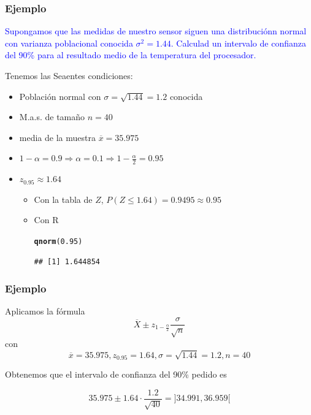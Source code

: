 \documentclass[12pt,t]{beamer}\usepackage[]{graphicx}\usepackage[]{color}
\makeatletter
\newcommand{\hlnum}[1]{\textcolor[rgb]{0.686,0.059,0.569}{#1}}%
\newcommand{\hlstd}[1]{\textcolor[rgb]{0.345,0.345,0.345}{#1}}%
\newcommand{\hlkwd}[1]{\textcolor[rgb]{0.737,0.353,0.396}{\textbf{#1}}}%
\newenvironment{kframe}{%
 \def\at@end@of@kframe{}%
 \ifinner\ifhmode%
  \def\at@end@of@kframe{\end{minipage}}%
  \begin{minipage}{\columnwidth}%
 \fi\fi%
 \def\FrameCommand##1{\hskip\@totalleftmargin \hskip-\fboxsep
 \colorbox{shadecolor}{##1}\hskip-\fboxsep
     \hskip-\linewidth \hskip-\@totalleftmargin \hskip\columnwidth}%
 \MakeFramed {\advance\hsize-\width
   \@totalleftmargin\z@ \linewidth\hsize
   \@setminipage}}%
 {\par\unskip\endMakeFramed%
 \at@end@of@kframe}
\newenvironment{knitrout}{}{} %
\newcommand{\blue}[1]{\textcolor{blue}{#1}}
\renewcommand{\leq}{\leqslant}
\theoremstyle{plain}
\theoremstyle{definition}
\makeatother
\begin{document}
\begin{frame}[fragile]
\frametitle{Ejemplo}
\vspace*{-3ex}

\blue{Supongamos  que las medidas de nuestro sensor siguen  una distribuciónn normal con varianza poblacional conocida $\sigma^2=1.44$. Calculad un intervalo de confianza  del 90\% para al resultado medio de la temperatura del procesador.}
\medskip

Tenemos las Seaentes condiciones:
\begin{itemize}
\item Población normal con $\sigma=\sqrt{1.44}=1.2$ conocida
\item M.a.s. de  tamaño  $n=40$
\item media de la muestra  $\overline{x}=35.975$
\item $1-\alpha=0.9\Rightarrow \alpha=0.1\Rightarrow 1-\frac{\alpha}{2}=0.95$
\item $z_{0.95}\approx 1.64$
\begin{itemize}
\item Con la tabla de $Z$, $P(Z\leq 1.64)=0.9495\approx 0.95$
\item Con R
\begin{knitrout}
\color{fgcolor}\begin{kframe}
\begin{alltt}
\hlkwd{qnorm}\hlstd{(}\hlnum{0.95}\hlstd{)}
\end{alltt}
\begin{verbatim}
## [1] 1.644854
\end{verbatim}
\end{kframe}
\end{knitrout}
\end{itemize}
\end{itemize}

\end{frame}


\begin{frame}
\frametitle{Ejemplo}
Aplicamos la fórmula
$$
\overline{X}\pm z_{1-\frac{\alpha}{2}} \frac{\sigma}{\sqrt{n}}
$$
con
$$
\overline{x}=35.975, z_{0.95}=1.64, \sigma=\sqrt{1.44}=1.2, n=40
$$

Obtenemos que el intervalo de confianza  del 90\% pedido es 

$$
35.975\pm 1.64\cdot\frac{1.2}{\sqrt{40}}=
]34.991 , 36.959[
$$

\end{frame}
\end{document}
